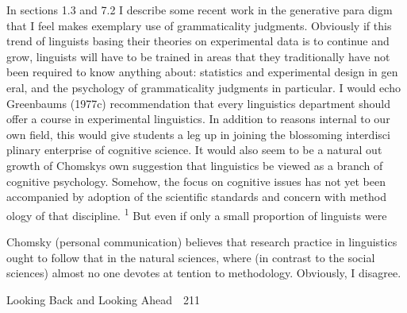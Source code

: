 \begin{styleTextbody}
In sections 1.3 and 7.2 I describe some recent work in the generative para\- digm that I feel makes exemplary use of grammaticality judgments. Obviously if this trend of linguists basing their theories on experimental data is to continue and grow, linguists will have to be trained in areas that they traditionally have not been required to know anything about: statistics and experimental design in gen\- eral, and the psychology of grammaticality judgments in particular. I would echo Greenbaum{\textquotesingle}s (1977c) recommendation that every linguistics department should offer a course in experimental linguistics. In addition to reasons internal to our own field, this would give students a leg up in joining the blossoming interdisci\- plinary enterprise of cognitive science. It would also seem to be a natural out\- growth of Chomsky{\textquotesingle}s own suggestion that linguistics be viewed as a branch of cognitive psychology. Somehow, the focus on cognitive issues has not yet been accompanied by adoption of the scientific standards and concern with method\- ology of that discipline. \textsuperscript{1}\textsuperscript{ }But even if only a small proportion of linguists were
\end{styleTextbody}


\begin{listWWNumxiiileveli}
\item 
\setcounter{listWWNumxiiilevelii}{2}
\begin{listWWNumxiiilevelii}
\item 
\setcounter{listWWNumxiiileveliii}{0}
\begin{listWWNumxiiileveliii}
\item 
\begin{styleStandard}
Chomsky (personal communication) believes that research practice in linguistics ought to follow that in the natural sciences, where (in contrast to the social sciences) {\textquotedbl}almost no one devotes at\- tention to {\textquotesingle}methodology{\textquotesingle}.{\textquotedbl} Obviously, I disagree.
\end{styleStandard}


\end{listWWNumxiiileveliii}
\end{listWWNumxiiilevelii}
\end{listWWNumxiiileveli}
\clearpage\setcounter{page}{1}\begin{styleStandard}
Looking Back and Looking Ahead\ \ 211
\end{styleStandard}


